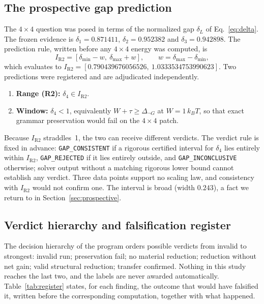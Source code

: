 \documentclass[11pt,a4paper]{article}
\theoremstyle{plain}
\theoremstyle{definition}
\theoremstyle{remark}
\newcommand{\lean}[1]{\nolinkurl{#1}}
\newcommand{\dnG}{\Delta_{\neg G}}
\newcommand{\kBT}{k_{B}T}
\newcommand{\intervalR}{I_{\mathrm{R2}}}
\begin{document}
\subsection{The prospective gap prediction}
The $4\times4$ question was posed in terms of the normalized gap $\delta_L$ of Eq.~\eqref{eq:delta}. The frozen evidence is $\delta_1=0.871411$, $\delta_2=0.952382$ and $\delta_3=0.942898$. The prediction rule, written before any $4\times4$ energy was computed, is
\[
\intervalR=[\delta_{\min}-w,\ \delta_{\max}+w],\qquad w=\delta_{\max}-\delta_{\min},
\]
which evaluates to $\intervalR=[0.790439676056526,\ 1.0333534753990623]$. Two predictions were registered and are adjudicated independently.
\begin{enumerate}[label=(\roman*)]
\item \textbf{Range (R2):} $\delta_4\in\intervalR$.
\item \textbf{Window:} $\delta_4<1$, equivalently $W+\tau\ge\dnG$ at $W=1\,\kBT$, so that exact grammar preservation would fail on the $4\times4$ patch.
\end{enumerate}
Because $\intervalR$ straddles~1, the two can receive different verdicts. The verdict rule is fixed in advance: \lean{GAP_CONSISTENT} if a rigorous certified interval for $\delta_4$ lies entirely within $\intervalR$, \lean{GAP_REJECTED} if it lies entirely outside, and \lean{GAP_INCONCLUSIVE} otherwise; solver output without a matching rigorous lower bound cannot establish any verdict. Three data points support no scaling law, and consistency with $\intervalR$ would not confirm one. The interval is broad (width $0.243$), a fact we return to in Section~\ref{sec:prospective}.

\subsection{Verdict hierarchy and falsification register}
The decision hierarchy of the program orders possible verdicts from invalid to strongest: invalid run; preservation fail; no material reduction; reduction without net gain; valid structural reduction; transfer confirmed. Nothing in this study reaches the last two, and the labels are never awarded automatically. Table~\ref{tab:register} states, for each finding, the outcome that would have falsified it, written before the corresponding computation, together with what happened.
\end{document}
